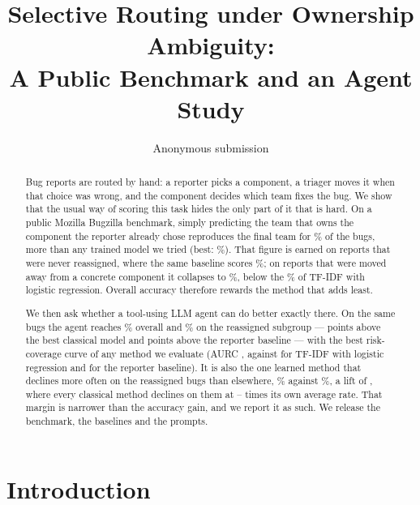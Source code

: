 \documentclass[sigconf,anonymous]{acmart}
\begin{document}
\title{Selective Routing under Ownership Ambiguity:\\
A Public Benchmark and an Agent Study}

\author{Anonymous submission}

\begin{abstract}
Bug reports are routed by hand: a reporter picks a component, a triager moves it when that choice
was wrong, and the component decides which team fixes the bug. We show that the usual way of
scoring this task hides the only part of it that is hard. On a public Mozilla Bugzilla benchmark,
simply predicting the team that owns the component the reporter already chose reproduces the final
team for \nRepAcc\% of the bugs, more than any trained model we tried (best: \nLrAcc\%). That
figure is earned on reports that were never reassigned, where the same baseline scores
\nRepNeverAcc\%; on reports that were moved away from a concrete component it collapses to
\nRepSpecAcc\%, below the \nLrSpecAcc\% of TF-IDF with logistic regression. Overall accuracy
therefore rewards the method that adds least.

We then ask whether a tool-using LLM agent can do better exactly there. On the same bugs the agent
reaches \nAgentAcc\% overall and \nAgentSpecAcc\% on the reassigned subgroup --- \nAgentSpecOverLr
points above the best classical model and \nAgentSpecOverRep{} points above the reporter baseline ---
with the best risk-coverage curve of any method we evaluate (AURC \nAgentAurc, against \nLrAurc{} for
TF-IDF with logistic regression and \nRepAurc{} for the reporter baseline). It is also the one learned
method that declines more often on the reassigned bugs than elsewhere, \nAgentSpecAbst\% against
\nAgentNeverAbst\%, a lift of \nAgentLift, where every classical method declines on them at
\nClassicalLiftMin--\nClassicalLiftMax{} times its own average rate. That margin is narrower than the accuracy gain, and we report
it as such. We release the benchmark, the baselines and the prompts.
\end{abstract}

\maketitle

\section{Introduction}
\end{document}
